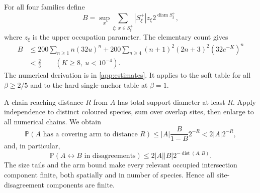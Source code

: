 \documentclass[11pt,reqno]{amsart}
\numberwithin{equation}{section}
\theoremstyle{definition}
\theoremstyle{remark}
\newcommand{\Prob}{\mathbb P}
\newcommand{\diam}{\operatorname{diam}}
\newcommand{\dist}{\operatorname{dist}}
\begin{document}
For all four families define
\begin{equation}\label{eq:Btotal}
 B=\sup_x\sum_{\xi:\,x\in S_\xi^+}|S_\xi^+|z_\xi2^{\diam S_\xi^+},
\end{equation}
where $z_\xi$ is the upper occupation parameter. The elementary count gives
\begin{align}
 B&\leq200\sum_{n\geq1}n(32u)^n
 +200\sum_{n\geq4}(n+1)^2(2n+3)^2(32e^{-K})^n\nonumber\\
 &<\frac23\qquad(K\geq8,\ u<10^{-4}).\label{eq:Bbound}
\end{align}
The numerical derivation is in \cref{app:estimates}. It applies to the soft table for all $\beta\geq2/5$ and to the hard single-anchor table at $\beta=1$.

A chain reaching distance $R$ from $A$ has total support diameter at least $R$. Apply independence to distinct coloured species, sum over overlap sites, then enlarge to all numerical chains. We obtain
\begin{equation}\label{eq:onearm}
 \Prob(A\text{ has a covering arm to distance }R)
 \leq |A|\frac B{1-B}2^{-R}<2|A|2^{-R},
\end{equation}
and, in particular,
\begin{equation}\label{eq:connection}
 \Prob(A\leftrightarrow B\text{ in disagreements})
 \leq 2|A||B|2^{-\dist(A,B)}.
\end{equation}
The size tails and the arm bound make every relevant occupied intersection component finite, both spatially and in number of species. Hence all site-disagreement components are finite.
\end{document}
